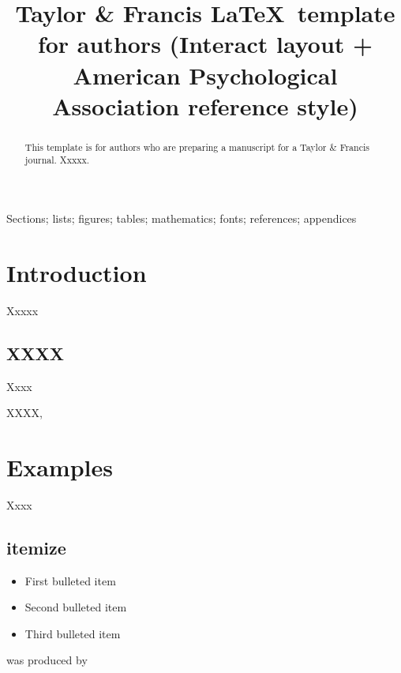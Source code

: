 \documentclass[]{interact}
\theoremstyle{plain}%
\theoremstyle{definition}
\theoremstyle{remark}
\begin{document}

\title{Taylor \& Francis \LaTeX\ template for authors (\textsf{Interact} layout + American Psychological Association reference style)}

\author{
}

\maketitle

\begin{abstract}
This template is for authors who are preparing a manuscript for a Taylor \& Francis journal.
Xxxxx.
\end{abstract}

\begin{keywords}
Sections; lists; figures; tables; mathematics; fonts; references; appendices
\end{keywords}


\section{Introduction}

Xxxxx


\subsection{XXXX}

Xxxx

XXXX\cite{Adams1973},\cite{Adams1973,Bro07}



\section{Examples} 
Xxxx

\subsection{itemize}
 
\begin{itemize}
  \item First bulleted item
  \item Second bulleted item
  \item Third bulleted item
\end{itemize}
was produced by
\end{document}

